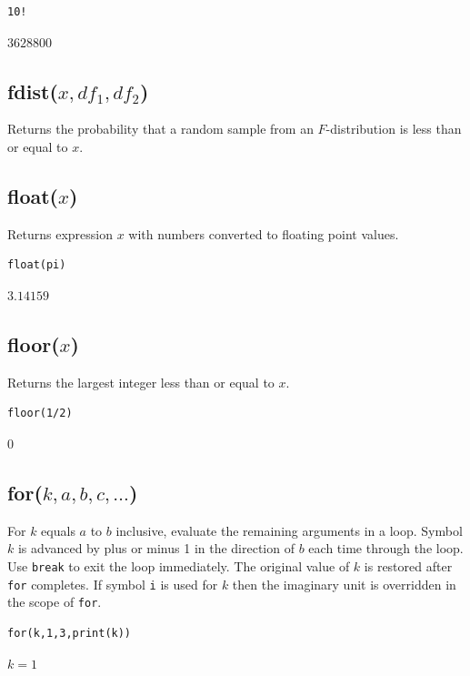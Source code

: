 \documentclass[12pt]{article}
\begin{document}
{\color{blue}
\begin{verbatim}
10!
\end{verbatim}
}

$3628800$

\subsection*{fdist($x,df_1,df_2$)}

Returns the probability that a random sample from an $F$-distribution is less than or equal to $x$.

\subsection*{float($x$)}

Returns expression $x$ with numbers converted to floating point values.

{\color{blue}
\begin{verbatim}
float(pi)
\end{verbatim}
}

$3.14159$

\subsection*{floor($x$)}

Returns the largest integer less than or equal to $x$.

{\color{blue}
\begin{verbatim}
floor(1/2)
\end{verbatim}
}

$0$

\subsection*{for($k,a,b,c,\ldots$)}

For $k$ equals $a$ to $b$ inclusive, evaluate the remaining arguments in a loop.
Symbol $k$ is advanced by plus or minus 1 in the direction of $b$ each time through the loop.
Use \verb$break$ to exit the loop immediately.
The original value of $k$ is restored after \verb$for$ completes.
If symbol \verb$i$ is used for $k$ then the imaginary unit is overridden in the scope of \verb$for$.

{\color{blue}
\begin{verbatim}
for(k,1,3,print(k))
\end{verbatim}
}

$k=1$
\end{document}
